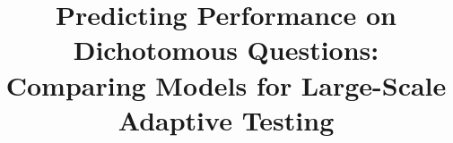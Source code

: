 \documentclass{edm_template}
\begin{document}
\title{Predicting Performance on Dichotomous Questions:\\Comparing Models for Large-Scale Adaptive Testing}
%
%
%
%
%
\end{document}

